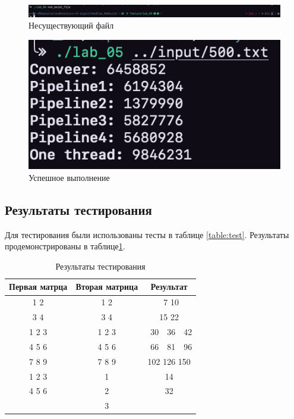 \documentclass[a4paper,12pt]{article}
\begin{document}
\begin{figure}[H]
    \centering
    \includegraphics[scale=0.4]{non_exist_file}
    \caption{Несуществующий файл}
    \label{img:nef}
\end{figure}

\begin{figure}[H]
    \centering
    \includegraphics[scale=0.8]{good}
    \caption{Успешное выполнение}
    \label{img:good}
\end{figure}

\subsection{Результаты тестирования}

Для тестирования были использованы тесты в таблице \ref{table:test}.
Результаты продемонстрированы в таблице\ref{table:test-res}.

\begin{table}[H]
    \caption{Результаты тестирования}
    \label{table:test-res}
    \centering
    \begin{tabular}{|c|c|c|}
        \hline
        Первая матрца & Вторая матрица & Результат \\
        \hline
        1 2 & 1 2 & \ 7 10 \\
        3 4 & 3 4 & 15 22 \\
        \hline
        1 2 3 & 1 2 3 & \ 30\ \ 36\ \ 42 \\
        4 5 6 & 4 5 6 & \ 66\ \ 81\ \ 96 \\
        7 8 9 & 7 8 9 & 102 126 150 \\
        \hline
        1 2 3 & 1 & 14 \\
        4 5 6 & 2 & 32 \\
              & 3 & \\
        \hline
    \end{tabular}
\end{table}
\end{document}
